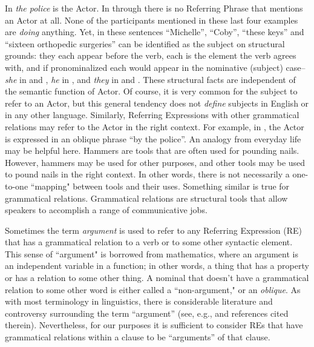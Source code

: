 In  \textit{the police} is the Actor. In  through  there is no Referring Phrase that mentions an Actor at all. None of the participants mentioned in these last four examples are \textit{doing} anything. Yet, in these sentences “Michelle”, “Coby”, “these keys” and “sixteen orthopedic surgeries” can be identified as the subject on structural grounds: they each appear before the verb, each is the element the verb agrees with, and if pronominalized each would appear in the nominative (subject) case--\textit{she} in  and , \textit{he} in , and \textit{they} in  and . These structural facts are independent of the semantic function of Actor. Of course, it is very common for the subject to refer to an Actor, but this general tendency does not \textit{define} subjects in English or in any other language. Similarly, Referring Expressions with other grammatical relations may refer to the Actor in the right context. For example, in , the Actor is expressed in an oblique phrase “by the police”. An analogy from everyday life may be helpful here. Hammers are tools that are often used for pounding nails. However, hammers may be used for other purposes, and other tools may be used to pound nails in the right context. In other words, there is not necessarily a one-to-one “mapping" between tools and their uses. Something similar is true for grammatical relations. Grammatical relations are structural tools that allow speakers to accomplish a range of communicative jobs.

Sometimes the term \textit{argument} is used to refer to any Referring Expression (RE) that has a grammatical relation to a verb or to some other syntactic element. This sense of “argument" is borrowed from mathematics, where an argument is an independent variable in a function; in other words, a thing that has a property or has a relation to some other thing. A nominal that doesn't have a grammatical relation to some other word is either called a “non-argument," or an \textit{oblique}. As with most terminology in linguistics, there is considerable literature and controversy surrounding the term “argument” (see, e.g., \citealt{grimshaw1990, malchukovcomrie2015, coon2017} and references cited therein). Nevertheless, for our purposes it is sufficient to consider REs that have grammatical relations within a clause to be “arguments” of that clause.

